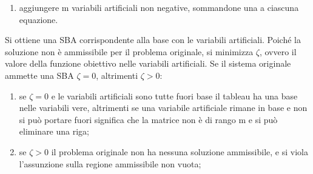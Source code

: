 \documentclass[answers, a4paper, 11pt]{exam}
\begin{document}
\begin{questions}
\begin{solution}
\begin{enumerate}
\item aggiungere m variabili artificiali non negative, sommandone una a ciascuna equazione.
\end{enumerate}
Si ottiene una SBA corrispondente alla base con le variabili artificiali. Poiché la soluzione non è ammissibile per il problema originale, si minimizza $\zeta$, ovvero il valore della funzione obiettivo nelle variabili artificiali. Se il sistema originale ammette una SBA $\zeta = 0$, altrimenti $\zeta > 0$:
\begin{enumerate}
\item se $\zeta = 0$ e le variabili artificiali sono tutte fuori base il tableau ha una base nelle variabili vere, altrimenti se una variabile artificiale rimane in base e non si può portare fuori significa che la matrice non è di rango m e si può eliminare una riga;
\item se $\zeta > 0$ il problema originale non ha nessuna soluzione ammissibile, e si viola l'assunzione sulla regione ammissibile non vuota;
\end{enumerate}
\end{solution}
\end{questions}
\end{document}
